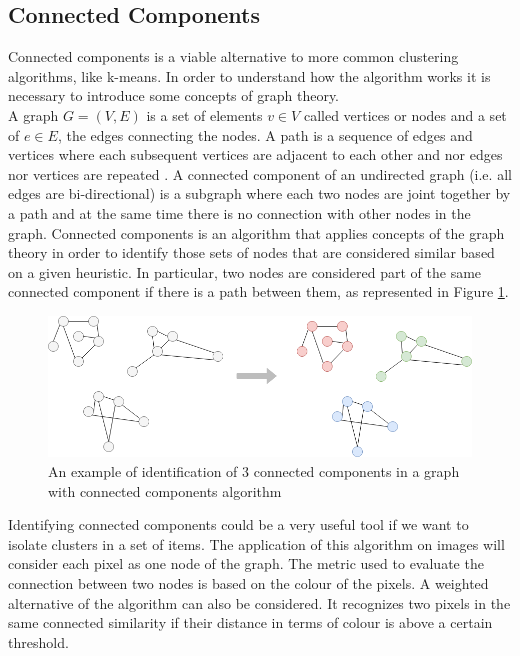 \documentclass{usiinftr}
\begin{document}
\subsection{Connected Components}
Connected components is a viable alternative to more common clustering algorithms, like k-means. In order to understand how the algorithm works it is necessary to introduce some concepts of graph theory. \\
A graph $G=(V,E)$ is a set of elements $v \in V$ called vertices or nodes and a set of $e \in E$, the edges connecting the nodes. A path is a sequence of edges and vertices where each subsequent vertices are adjacent to each other and nor edges nor vertices are repeated \cite{12}. 
A connected component of an undirected graph (i.e. all edges are bi-directional)  is a subgraph where each two nodes are joint together by a path and at the same time  there is no connection with other nodes in the graph. 
Connected components is an algorithm that applies concepts of the graph theory in order to identify those sets of nodes that are considered similar based on a given heuristic. In particular, two nodes are considered part of the same connected component if there is a path between them, as represented in Figure \ref{fig:2}. \\
\begin{figure}[h]
	\centering
	\includegraphics[width=0.6\linewidth]{img/conn_comp}
	\caption{An example of identification of 3 connected components in a graph with connected components algorithm}
	\label{fig:2}
\end{figure}
\newpage
\noindent
Identifying connected components could be a very useful tool if we want to isolate clusters in a set of items. 
The application of this algorithm on images will consider each pixel as one node of the graph. The metric used to evaluate the connection between two nodes is based on the colour of the pixels. A weighted alternative of the algorithm can also be considered. It recognizes two pixels in the same connected similarity if their distance in terms of colour is above a certain threshold.\\
\end{document}
